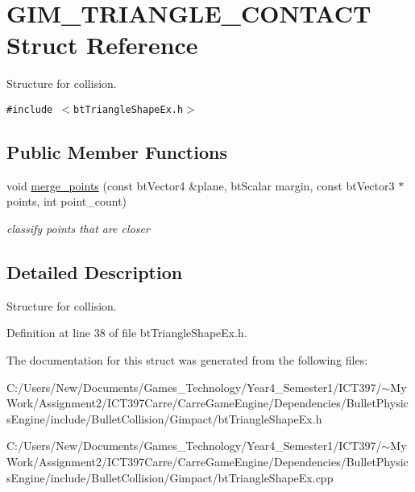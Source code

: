 \hypertarget{struct_g_i_m___t_r_i_a_n_g_l_e___c_o_n_t_a_c_t}{
\section{GIM\_\-TRIANGLE\_\-CONTACT Struct Reference}
\label{struct_g_i_m___t_r_i_a_n_g_l_e___c_o_n_t_a_c_t}
}
Structure for collision.  


{\tt \#include $<$btTriangleShapeEx.h$>$}

\subsection*{Public Member Functions}
\begin{CompactItemize}
\item 
\hypertarget{struct_g_i_m___t_r_i_a_n_g_l_e___c_o_n_t_a_c_t_c506be6f6fe6cb2f37b2890669f69266}{
void \hyperlink{struct_g_i_m___t_r_i_a_n_g_l_e___c_o_n_t_a_c_t_c506be6f6fe6cb2f37b2890669f69266}{merge\_\-points} (const btVector4 \&plane, btScalar margin, const btVector3 $\ast$points, int point\_\-count)}
\label{struct_g_i_m___t_r_i_a_n_g_l_e___c_o_n_t_a_c_t_c506be6f6fe6cb2f37b2890669f69266}

\begin{CompactList}\small\item\em classify points that are closer \item\end{CompactList}\end{CompactItemize}


\subsection{Detailed Description}
Structure for collision. 

Definition at line 38 of file btTriangleShapeEx.h.

The documentation for this struct was generated from the following files:\begin{CompactItemize}
\item 
C:/Users/New/Documents/Games\_\-Technology/Year4\_\-Semester1/ICT397/$\sim$My Work/Assignment2/ICT397Carre/CarreGameEngine/Dependencies/BulletPhysicsEngine/include/BulletCollision/Gimpact/btTriangleShapeEx.h\item 
C:/Users/New/Documents/Games\_\-Technology/Year4\_\-Semester1/ICT397/$\sim$My Work/Assignment2/ICT397Carre/CarreGameEngine/Dependencies/BulletPhysicsEngine/include/BulletCollision/Gimpact/btTriangleShapeEx.cpp\end{CompactItemize}
